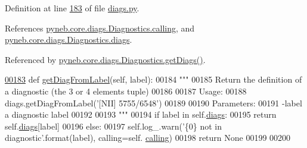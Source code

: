 Definition at line \hyperlink{diags_8py_source_l00183}{183} of file \hyperlink{diags_8py_source}{diags.\+py}.



References \hyperlink{diags_8py_source_l00169}{pyneb.\+core.\+diags.\+Diagnostics.\+calling}, and \hyperlink{diags_8py_source_l00173}{pyneb.\+core.\+diags.\+Diagnostics.\+diags}.



Referenced by \hyperlink{diags_8py_source_l00201}{pyneb.\+core.\+diags.\+Diagnostics.\+get\+Diags()}.


\begin{DoxyCode}
\hypertarget{classpyneb_1_1core_1_1diags_1_1_diagnostics_l00183}{}\hyperlink{classpyneb_1_1core_1_1diags_1_1_diagnostics_acf43d1129a2fbbdcecb4bbf1389872bc}{00183}     \textcolor{keyword}{def }\hyperlink{classpyneb_1_1core_1_1diags_1_1_diagnostics_acf43d1129a2fbbdcecb4bbf1389872bc}{getDiagFromLabel}(self, label):
00184         \textcolor{stringliteral}{"""}
00185 \textcolor{stringliteral}{        Return the definition of a diagnostic (the 3 or 4 elements tuple)}
00186 \textcolor{stringliteral}{        }
00187 \textcolor{stringliteral}{        Usage:}
00188 \textcolor{stringliteral}{            diags.getDiagFromLabel('[NII] 5755/6548')}
00189 \textcolor{stringliteral}{        }
00190 \textcolor{stringliteral}{        Parameters:}
00191 \textcolor{stringliteral}{            -label a diagnostic label }
00192 \textcolor{stringliteral}{            }
00193 \textcolor{stringliteral}{        """}
00194         \textcolor{keywordflow}{if} label \textcolor{keywordflow}{in} self.\hyperlink{classpyneb_1_1core_1_1diags_1_1_diagnostics_a0c0f7e36097677f61a6a14a0c3127b02}{diags}:
00195             \textcolor{keywordflow}{return} self.\hyperlink{classpyneb_1_1core_1_1diags_1_1_diagnostics_a0c0f7e36097677f61a6a14a0c3127b02}{diags}[label]
00196         \textcolor{keywordflow}{else}:
00197             self.log\_.warn(\textcolor{stringliteral}{'\{0\} not in diagnostic'}.format(label), calling=self.
      \hyperlink{classpyneb_1_1core_1_1diags_1_1_diagnostics_a07dce673fec8b2383ef411ab94b0b2fe}{calling})
00198             \textcolor{keywordflow}{return} \textcolor{keywordtype}{None}
00199 
00200         
\end{DoxyCode}
\hypertarget{classpyneb_1_1core_1_1diags_1_1_diagnostics_a74db66bd37fcea46097e4dfad4113b41}{}
